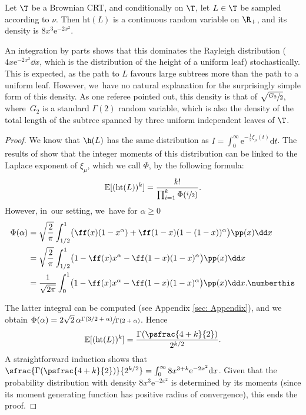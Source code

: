 \begin{prop}\label{prop:hd} Let $ \T$ be a Brownian CRT, and conditionally on $\T$, let $ L \in \T$ be sampled according to $\nu$. Then $ \mathrm{ht}(L)$ is a continuous random variable on $\R_+$, and its density is $8x^3\mathrm{e}^{-2x^2}$.
\end{prop}

\begin{rem} An integration by parts shows that this dominates the Rayleigh distribution ($4x\mathrm{e}^{-2x^2} \dd x$, which is the distribution of the height of a uniform leaf) stochastically. This is expected, as the path to $L$ favours large subtrees more than the path to a uniform leaf. However, we~have no natural explanation for the surprisingly simple form of this density. As one referee pointed out, this density is that of $\sqrt{\sfrac{G_2}{2}}$, where~$G_2$ is a standard $\Gamma(2)$ random variable, which is also the density of the total length of the subtree spanned by three uniform independent leaves of $\T$.
\end{rem}

\begin{proof}
We know that $\h(L)$ has the same distribution as $I=\int_{0}^{\infty}\mathrm{e}^{-\frac12 \xi_\mu(t)}\mathrm{d}t$.
The results of \cite{Carmona/Petit/Yor} show that the integer moments of this distribution can be linked to the Laplace exponent of $\xi_\mu$, which we call $\Phi$, by the following formula:
\[
\mathbb{E}[(\mathrm{ht}(L))^k]=\frac{k!}{\prod_{i=1}^k \Phi(\sfrac{i}{2})}.
\]
However, in~our setting, we~have for $\alpha\geq 0$
\begin{align*}\Phi(\alpha)&=\sqrt{\frac{2}{\pi}}\int_{1/2}^{1}\bigl(\ff(x)(1-x^{\alpha})+\ff(1-x)(1-(1-x))^{\alpha}\bigr)\pp(x)\dd x \\
&=\sqrt{\frac{2}{\pi}}\int_{1/2}^{1}\bigl(1-\ff(x)x^{\alpha}-\ff(1-x)(1-x)^{\alpha}\bigr)\pp(x)\dd x\\
&=\frac1{\sqrt{2\pi}}\int_{0}^{1}\bigl(1-\ff(x)x^{\alpha}-\ff(1-x)(1-x)^{\alpha}\bigr)\pp(x)\dd x.\numberthis \label{leafheightintegral}
\end{align*}

The latter integral can be computed (see Appendix \ref{sec: Appendix}), and we obtain $\Phi(\alpha)=2\sqrt{2}\,\alpha\sfrac{\Gamma(3/2+\alpha)}{\Gamma(2+\alpha)}$. Hence
\[
\mathbb{E}[(\mathrm{ht}(L))^k]=\frac{\Gamma(\psfrac{4+k}{2})}{2^{k/2}}.
\]
A straightforward induction shows that $\sfrac{\Gamma(\psfrac{4+k}{2})}{2^{k/2}}=\int_0^{\infty} 8x^{3+k}\mathrm{e}^{-2x^2} \mathrm{d}x$. Given that the probability distribution with density $8x^3\mathrm{e}^{-2x^2}$ is determined by its moments (since its moment generating function has positive radius of convergence), this ends the proof.
\end{proof}

